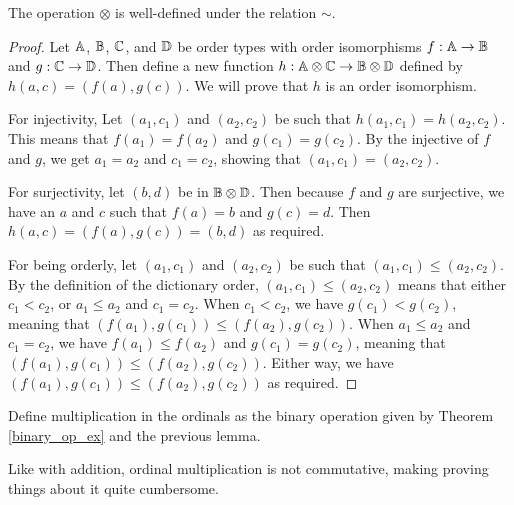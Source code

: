 \documentclass[../../math.tex]{subfiles}
\begin{document}
\begin{lemma}
    The operation $\otimes$ is well-defined under the relation $\sim$.
\end{lemma}
\begin{proof}
    Let $\mathbb{A}$, $\mathbb{B}$, $\mathbb{C}$, and $\mathbb{D}$ be order types with order isomorphisms $f :
    \mathbb{A} \to \mathbb{B}$ and $g : \mathbb{C} \to \mathbb{D}$.  Then define a new function $h : \mathbb{A} \otimes
    \mathbb{C} \to \mathbb{B} \otimes \mathbb{D}$ defined by $h(a, c) = (f(a), g(c))$.  We will prove
    that $h$ is an order isomorphism.

    For injectivity, Let $(a_1, c_1)$ and $(a_2, c_2)$ be such that $h(a_1, c_1)
    = h(a_2, c_2)$.  This means that $f(a_1) = f(a_2)$ and $g(c_1) = g(c_2)$.
    By the injective of $f$ and $g$, we get $a_1 = a_2$ and $c_1 = c_2$, showing
    that $(a_1, c_1) = (a_2, c_2)$.

    For surjectivity, let $(b, d)$ be in $\mathbb{B} \otimes \mathbb{D}$.  Then because $f$ and
    $g$ are surjective, we have an $a$ and $c$ such that $f(a) = b$ and $g(c) =
    d$.  Then $h(a, c) = (f(a), g(c)) = (b, d)$ as required.

    For being orderly, let $(a_1, c_1)$ and $(a_2, c_2)$ be such that $(a_1,
    c_1) \leq (a_2, c_2)$.  By the definition of the dictionary order, $(a_1,
    c_1) \leq (a_2, c_2)$ means that either $c_1 < c_2$, or $a_1 \leq a_2$ and
    $c_1 = c_2$.  When $c_1 < c_2$, we have $g(c_1) < g(c_2)$, meaning that
    $(f(a_1), g(c_1)) \leq (f(a_2), g(c_2))$.  When $a_1 \leq a_2$ and $c_1 =
    c_2$, we have $f(a_1) \leq f(a_2)$ and $g(c_1) = g(c_2)$, meaning that
    $(f(a_1), g(c_1)) \leq (f(a_2), g(c_2))$.  Either way, we have $(f(a_1),
    g(c_1)) \leq (f(a_2), g(c_2))$ as required.
\end{proof}

\begin{instance}
    Define multiplication in the ordinals as the binary operation given by
    Theorem \ref{binary_op_ex} and the previous lemma.
\end{instance}

Like with addition, ordinal multiplication is not commutative, making proving
things about it quite cumbersome.
\end{document}
